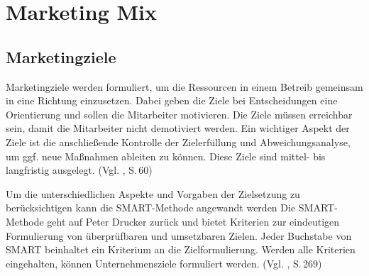 \section{Marketing Mix}

\subsection{Marketingziele} \label{mziele}
    Marketingziele werden formuliert, um die Ressourcen in einem Betreib gemeinsam in eine Richtung einzusetzen. Dabei
    geben die Ziele bei Entscheidungen eine Orientierung und sollen die Mitarbeiter motivieren. Die Ziele müssen
    erreichbar sein, damit die Mitarbeiter nicht demotiviert werden. Ein wichtiger Aspekt der Ziele ist die
    anschließende Kontrolle der Zielerfüllung und Abweichungsanalyse, um ggf. neue Maßnahmen ableiten zu können. Diese
    Ziele sind mittel- bis langfristig ausgelegt. (Vgl. \cite{Becker2018}, S.\,60)

    \noindent
    Um die unterschiedlichen Aspekte und Vorgaben der Zielsetzung zu berücksichtigen kann die SMART-Methode angewandt
    werden Die SMART-Methode geht auf Peter Drucker zurück und bietet Kriterien zur eindeutigen Formulierung von
    überprüfbaren und umsetzbaren Zielen. Jeder Buchstabe von SMART beinhaltet ein Kriterium an die Zielformulierung.
    Werden alle Kriterien eingehalten, können Unternehmensziele formuliert werden. (Vgl. \cite{Lawlor2012}, S.\,269)

